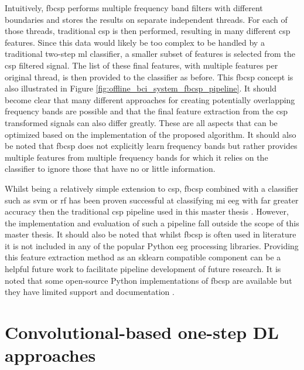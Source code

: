 Intuitively, \gls{fbcsp} performs multiple frequency band filters with different boundaries and stores the results on separate independent threads.
For each of those threads, traditional \gls{csp} is then performed, resulting in many different \gls{csp} features.
Since this data would likely be too complex to be handled by a traditional two-step \gls{ml} classifier, a smaller subset of features is selected from the \gls{csp} filtered signal.
The list of these final features, with multiple features per original thread, is then provided to the classifier as before.
This \gls{fbcsp} concept is also illustrated in Figure \ref{fig:offline_bci_system_fbcsp_pipeline}.
It should become clear that many different approaches for creating potentially overlapping frequency bands are possible and that the final feature extraction from the \gls{csp} transformed signals can also differ greatly.
These are all aspects that can be optimized based on the implementation of the proposed algorithm.
It should also be noted that \gls{fbcsp} does not explicitly learn frequency bands but rather provides multiple features from multiple frequency bands for which it relies on the classifier to ignore those that have no or little information.

Whilst being a relatively simple extension to \gls{csp}, \gls{fbcsp} combined with a classifier such as \gls{svm} or \gls{rf} has been proven successful at classifying \gls{mi} \gls{eeg} with far greater accuracy then the traditional \gls{csp} pipeline used in this master thesis \citep{eeg_model_fbcsp, four_class_mi_CSP_good, fbcsp_classi_eeg_mi}.
However, the implementation and evaluation of such a pipeline fall outside the scope of this master thesis.
It should also be noted that whilst \gls{fbcsp} is often used in literature it is not included in any of the popular Python \gls{eeg} processing libraries.
Providing this feature extraction method as an \gls{sklearn} compatible component can be a helpful future work to facilitate pipeline development of future research.
It is noted that some open-source Python implementations of \gls{fbcsp} are available but they have limited support and documentation \citep{fbcsp_git1, fbcsp_git2}.



\section{Convolutional-based one-step DL approaches}
\label{sec:offline_bci_system_one_step_dl}

